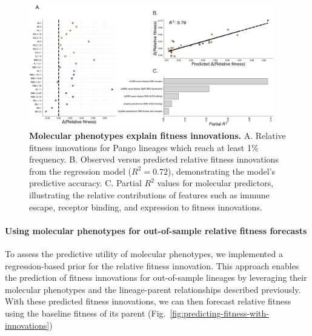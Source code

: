 \begin{figure}[h]
	\centering
	\includegraphics[width=0.95\textwidth]{./figures/explaining-fitness-innovations.png}
	\caption{\textbf{Molecular phenotypes explain fitness innovations.}
	    A. Relative fitness innovations for Pango lineages which reach at least 1\% frequency.
	    B. Observed versus predicted relative fitness innovations from the regression model ($R^2 = 0.72$), demonstrating the model’s predictive accuracy.
	    C. Partial $R^2$ values for molecular predictors, illustrating the relative contributions of features such as immune escape, receptor binding, and expression to fitness innovations.
	}
	\label{fig:explaining-fitness-innovations}
\end{figure}

\paragraph{Using molecular phenotypes for out-of-sample relative fitness forecasts}

To assess the predictive utility of molecular phenotypes, we implemented a regression-based prior for the relative fitness innovation. This approach enables the prediction of fitness innovations for out-of-sample lineages by leveraging their molecular phenotypes and the lineage-parent relationships described previously.
With these predicted fitness innovations, we can then forecast relative fitness using the baseline fitness of its parent (Fig.~\ref{fig:predicting-fitness-with-innovations})



